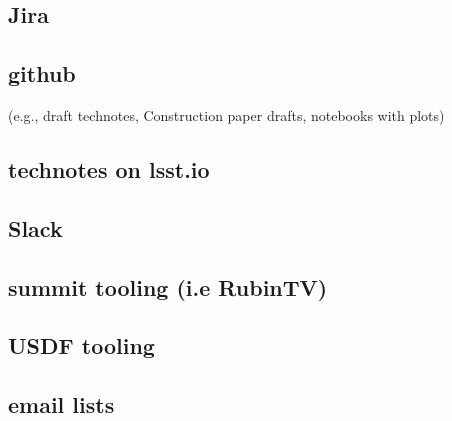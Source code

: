 \subsection{Jira}
\subsection{github }
(e.g., draft technotes, Construction paper drafts, notebooks with plots)
\subsection{technotes on lsst.io}
\subsection{Slack}
\subsection{summit tooling (i.e RubinTV)}
\subsection{USDF tooling}
\subsection{email lists }
